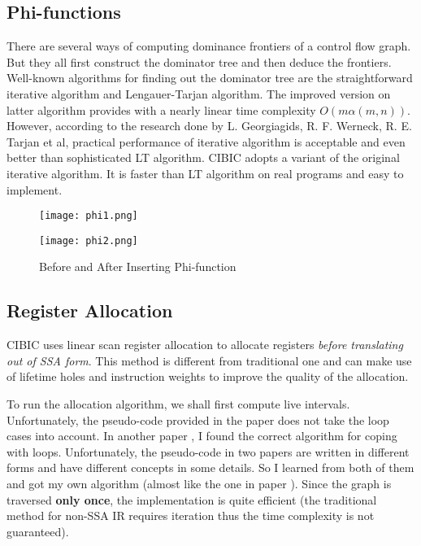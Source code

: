 \documentclass[10pt, a4paper]{article}
\begin{document}
\subsection{Phi-functions}
There are several ways of computing dominance frontiers of a control flow
graph.  But they all first construct the dominator tree and then deduce the
frontiers.  Well-known algorithms for finding out the dominator tree are the
straightforward iterative algorithm and Lengauer-Tarjan algorithm. The improved
version on latter algorithm provides with a nearly linear time complexity $O(m
\alpha(m, n))$. However, according to the research \cite{tarjan06} done by L.
Georgiagids, R.  F. Werneck, R. E. Tarjan et al, practical performance of
iterative algorithm is acceptable and even better than sophisticated LT
algorithm. CIBIC adopts a variant \cite{cooper01} of the original iterative
algorithm. It is faster than LT algorithm on real programs and easy to
implement.
\begin{figure}
    \centering
    \begin{minipage}{0.4\textwidth}
        \texttt{[image: phi1.png]}
    \end{minipage}
    \begin{minipage}{0.4\textwidth}
        \texttt{[image: phi2.png]}
    \end{minipage}
    \caption{Before and After Inserting Phi-function}
    \label{fig:phi_function}
\end{figure}
\subsection{Register Allocation}
CIBIC uses linear scan register allocation \cite{moe02} to allocate registers
\emph{before translating out of SSA form}. This method is different from
traditional one and can make use of lifetime holes and instruction weights to
improve the quality of the allocation.

To run the allocation algorithm, we shall first compute live intervals.
Unfortunately, the pseudo-code provided in the paper \cite{moe02} does not take
the loop cases into account. In another paper \cite{wimmer10}, I found the
correct algorithm for coping with loops. Unfortunately, the pseudo-code in two
papers are written in different forms and have different concepts in some
details. So I learned from both of them and got my own algorithm (almost like
the one in paper \cite{moe02}). Since the graph is traversed \textbf{only
once}, the implementation is quite efficient (the traditional method for
non-SSA IR requires iteration thus the time complexity is not guaranteed).
\end{document}

